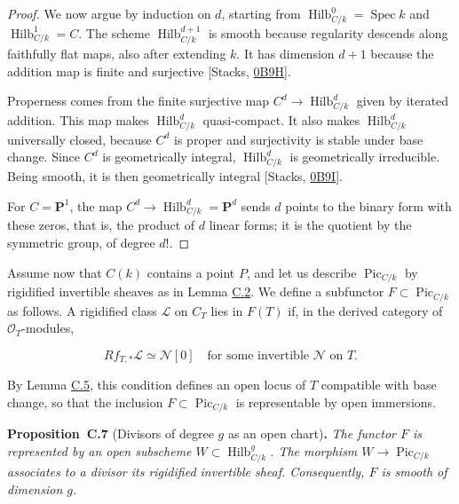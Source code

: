 \documentclass[11pt]{article}
\newenvironment{bpstatement}[2]{\par\addvspace{0.6\baselineskip}\noindent\textbf{#1}#2\textbf{.}\enspace\ignorespaces}
  {\par\addvspace{0.4\baselineskip}}
\newenvironment{bpstatementit}[2]{\begin{bpstatement}{#1}{#2}\itshape\ignorespaces}{\end{bpstatement}}
\begin{document}
\begin{proof}[{Proof}]
We now argue by induction on \(d\), starting from \(\operatorname{Hilb}^{0}_{C/k}=\operatorname{Spec}k\) and \(\operatorname{Hilb}^{1}_{C/k}=C\). The scheme \(\operatorname{Hilb}^{d+1}_{C/k}\) is smooth because regularity descends along faithfully flat maps, also after extending \(k\). It has dimension \(d+1\) because the addition map is finite and surjective [Stacks, \href{https://stacks.math.columbia.edu/tag/0B9H}{0B9H}].

Properness comes from the finite surjective map \(C^d\to \operatorname{Hilb}^{d}_{C/k}\) given by iterated addition. This map makes \(\operatorname{Hilb}^{d}_{C/k}\) quasi-compact. It also makes \(\operatorname{Hilb}^{d}_{C/k}\) universally closed, because \(C^d\) is proper and surjectivity is stable under base change. Since \(C^d\) is geometrically integral, \(\operatorname{Hilb}^{d}_{C/k}\) is geometrically irreducible. Being smooth, it is then geometrically integral [Stacks, \href{https://stacks.math.columbia.edu/tag/0B9I}{0B9I}].

For \(C=\mathbf P^1\), the map \(C^d\to \operatorname{Hilb}^{d}_{C/k}=\mathbf P^d\) sends \(d\) points to the binary form with these zeros, that is, the product of \(d\) linear forms; it is the quotient by the symmetric group, of degree \(d!\).
\end{proof}

\label{bp141}%
Assume now that \(C(k)\) contains a point \(P\), and let us describe \(\operatorname{Pic}_{C/k}\) by rigidified invertible sheaves as in Lemma \hyperref[bp125]{C.2}. We define a subfunctor \(F\subset\operatorname{Pic}_{C/k}\) as follows. A rigidified class \(\mathcal L\) on \(C_T\) lies in \(F(T)\) if, in the derived category of \(\mathcal O_T\)-modules,

\[
Rf_{T,*}\mathcal L\simeq\mathcal N[0]
\quad\text{for some invertible }\mathcal N\text{ on }T.
\]

By Lemma \hyperref[bp135]{C.5}, this condition defines an open locus of \(T\) compatible with base change, so that the inclusion \(F\subset\operatorname{Pic}_{C/k}\) is representable by open immersions.

\label{bp142}%
\begin{bpstatementit}{Proposition~C.7}{ (Divisors of degree $g$ as an open chart)}
The functor \(F\) is represented by an open subscheme \(W\subset \operatorname{Hilb}^{g}_{C/k}\). The morphism \(W\to\operatorname{Pic}_{C/k}\) associates to a divisor its rigidified invertible sheaf. Consequently, \(F\) is smooth of dimension \(g\).
\end{bpstatementit}
\end{document}
